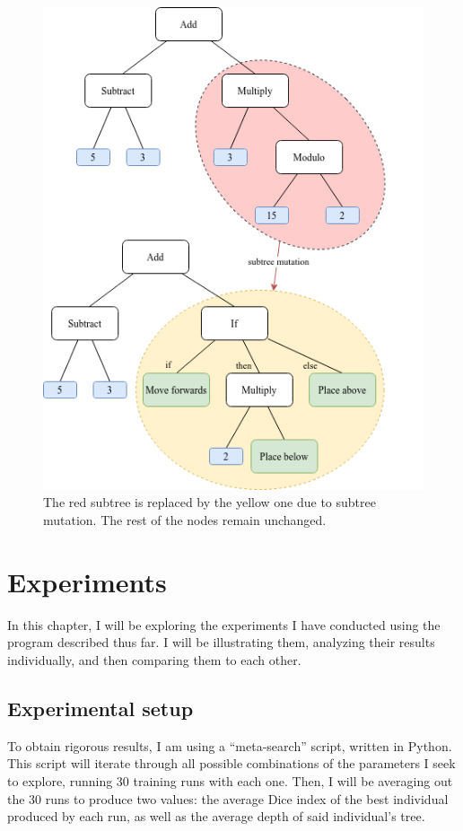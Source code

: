 \documentclass{report}
\begin{document}
\begin{figure}[ht]
    \centering
    \includegraphics[scale=0.75]{subtree_mutation}
    \caption{The red subtree is replaced by the yellow one due to subtree mutation. The rest of the nodes remain unchanged.}
\end{figure}

\chapter{Experiments}

In this chapter, I will be exploring the experiments I have conducted using the program described thus far. I will be illustrating them, analyzing their results individually, and then comparing them to each other.

\section{Experimental setup}

To obtain rigorous results, I am using a ``meta-search'' script, written in Python. This script will iterate through all possible combinations of the parameters I seek to explore, running 30 training runs with each one. Then, I will be averaging out the 30 runs to produce two values: the average Dice index of the best individual produced by each run, as well as the average depth of said individual's tree.
\end{document}
